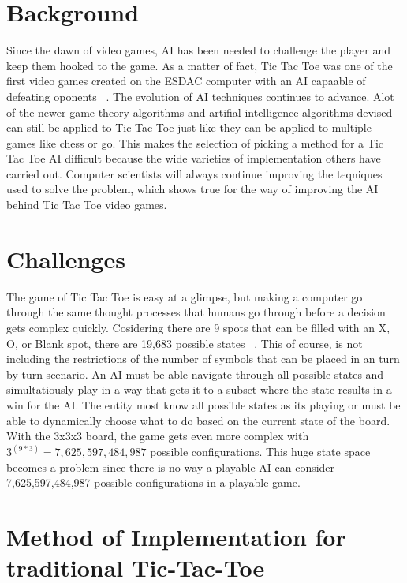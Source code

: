 \documentclass[letterpaper]{article}
\begin{document}
\section{Background}
Since the dawn of video games, AI has been needed to challenge the player and keep them hooked to the game. As a matter of fact, Tic Tac Toe was one of the first video games created on the ESDAC computer with an AI capaable of defeating oponents ~\cite{beck}. The evolution of AI techniques continues to advance. Alot of the newer game theory algorithms and artifial intelligence algorithms devised can still be applied to Tic Tac Toe just like they can be applied to multiple games like chess or go. This makes the selection of picking a method for a Tic Tac Toe AI difficult because the wide varieties of implementation others have carried out. Computer scientists will always continue improving the teqniques used to solve the problem, which shows true for the way of improving the AI behind Tic Tac Toe video games.

\section{Challenges}
The game of Tic Tac Toe is easy at a glimpse, but making a computer go through the same thought processes that humans go through before a decision gets complex quickly. Cosidering there are 9 spots that can be filled with an X, O, or Blank spot, there are 19,683 possible states ~\cite {garg_2017}. This of course, is not including the restrictions of the number of symbols that can be placed in an turn by turn scenario. An AI must be able navigate through all possible states and simultatiously play in a way that gets it to a subset where the state results in a win for the AI. The entity most know all possible states as its playing or must be able to dynamically choose what to do based on the current state of the board. With the 3x3x3 board, the game gets even more complex with $3^(9*3) = 7,625,597,484,987$ possible configurations. This huge state space becomes a problem since there is no way a playable AI can consider 7,625,597,484,987 possible configurations in a playable game.

\section{Method of Implementation for traditional Tic-Tac-Toe}
\end{document}
